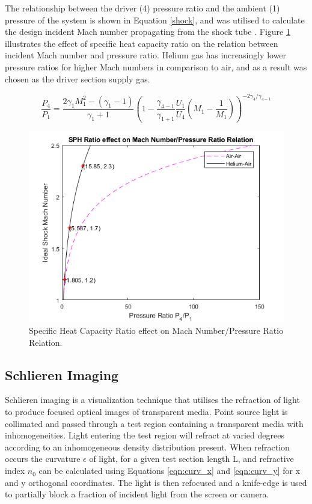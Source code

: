 The relationship between the driver (4) pressure ratio and the ambient (1) pressure of the system is shown in Equation \ref{shock}, and was utilised to calculate the design incident Mach number propagating from the shock tube \cite{anderson2010fundamentals}. Figure \ref{fig:gas_relation} illustrates the effect of specific heat capacity ratio on the relation between incident Mach number and pressure ratio. Helium gas has increasingly lower pressure ratios for higher Mach numbers in comparison to air, and as a result was chosen as the driver section supply gas.

\begin{equation} \label{shock}
\frac{P_4}{P_1} = \frac{2\gamma_1M_1^2 - (\gamma_1 - 1)}{\gamma_1 + 1}\left(1 - \frac{\gamma_{4-1}}{\gamma_{1+1}}\frac{U_1}{U_4}\left(M_1 - \frac{1}{M_1}\right)\right)^{-2\gamma_4/\gamma_{4-1}}
\end{equation}

\begin{figure}[H] 
	\centering
	\includegraphics[scale=0.9]{fig1.png} 
	\caption{Specific Heat Capacity Ratio effect on Mach Number/Pressure Ratio Relation.}
	\label{fig:gas_relation}
\end{figure}

\subsection{Schlieren Imaging}
Schlieren imaging is a visualization technique that utilises the refraction of light to produce focused optical images of transparent media. Point source light is collimated and passed through a test region containing a transparent media with inhomogeneities. Light entering the test region will refract at varied degrees according to an inhomogeneous density distribution present. When refraction occurs the curvature $\epsilon$ of light, for a given test section length L, and refractive index $n_0$ can be calculated using Equations \ref{eqn:curv_x} and \ref{eqn:curv_y} for x and y orthogonal coordinates. The light is then refocused and a knife-edge is used to partially block a fraction of incident light from the screen or camera.

